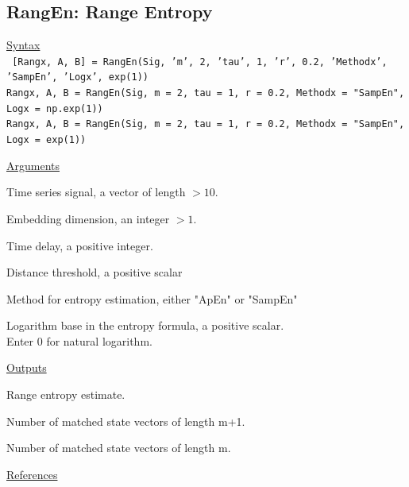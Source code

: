 \documentclass[12pt, a4paper, titlepage, openany]{book}
\begin{document}
\newpage
\subsection{\normalsize RangEn: \hspace{15mm} Range Entropy} \label{RangEn}
\noindent\ul{Syntax} \vspace{6mm} \\ \noindent \texttt{\footnotesize
[Rangx, A, B] = RangEn(Sig, 'm', 2, 'tau', 1, 'r', 0.2, 'Methodx', 'SampEn', 'Logx', exp(1)) \\
Rangx, A, B = RangEn(Sig, m = 2, tau = 1, r = 0.2, Methodx = "SampEn", Logx = np.exp(1)) \\
Rangx, A, B = RangEn(Sig, m = 2, tau = 1, r = 0.2, Methodx = "SampEn", Logx = exp(1))}


\noindent \ul{Arguments}
\begin{description}[labelsep=1cm, labelwidth=2cm, nosep, style=multiline,leftmargin=3cm]\footnotesize
\item[\texttt{Sig}]		Time series signal, a vector of length $> 10$.
\item[\texttt{m}]		Embedding dimension, an integer $ > 1$.
\item[\texttt{tau}]		Time delay, a positive integer.
\item[\texttt{r}]		Distance threshold, a positive scalar
\item[\texttt{Methodx}]		Method for entropy estimation, either "ApEn" or "SampEn"  
\item[\texttt{Logx}]	Logarithm base in the entropy formula, a positive scalar.\\
		Enter 0 for natural logarithm.
\end{description}

\noindent \ul{Outputs}
\begin{description}[labelsep=1cm, labelwidth=2cm, nosep, style=multiline,leftmargin=3cm]\footnotesize
\item[\texttt{Rangx}]	Range entropy estimate.
\item[\texttt{A}]	Number of matched state vectors of length m+1.
\item[\texttt{B}]	Number of matched state vectors of length m.
\end{description}

\noindent \ul{References}\hspace{1cm}
\cite{Rang1} \cite{Ap1} \cite{Samp1}
\end{document}
